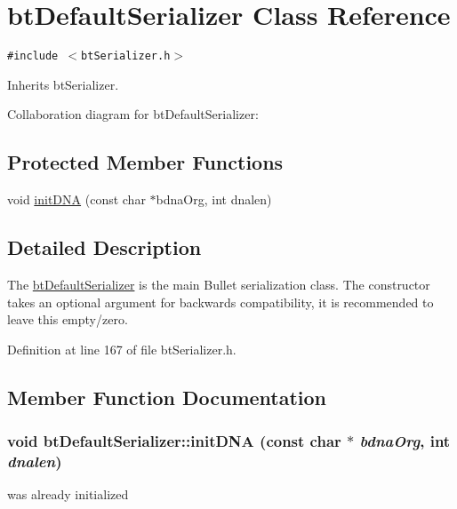 \hypertarget{classbt_default_serializer}{
\section{btDefaultSerializer Class Reference}
\label{classbt_default_serializer}
}
{\tt \#include $<$btSerializer.h$>$}

Inherits btSerializer.

Collaboration diagram for btDefaultSerializer:\subsection*{Protected Member Functions}
\begin{CompactItemize}
\item 
void \hyperlink{classbt_default_serializer_086b9ce0a49cb08de90528644bfe9d83}{initDNA} (const char $\ast$bdnaOrg, int dnalen)
\end{CompactItemize}


\subsection{Detailed Description}
The \hyperlink{classbt_default_serializer}{btDefaultSerializer} is the main Bullet serialization class. The constructor takes an optional argument for backwards compatibility, it is recommended to leave this empty/zero. 

Definition at line 167 of file btSerializer.h.

\subsection{Member Function Documentation}
\hypertarget{classbt_default_serializer_086b9ce0a49cb08de90528644bfe9d83}{
\subsubsection[initDNA]{\setlength{\rightskip}{0pt plus 5cm}void btDefaultSerializer::initDNA (const char $\ast$ {\em bdnaOrg}, \/  int {\em dnalen})}}
\label{classbt_default_serializer_086b9ce0a49cb08de90528644bfe9d83}




was already initialized 

